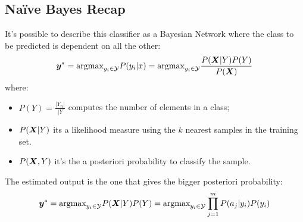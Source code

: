 \subsection{Naïve Bayes Recap}
It's possible to describe this classifier as a Bayesian Network where the class to be predicted is dependent on all the other:
\[\bm{y}^*=\text{argmax}_{y_i\in\mathcal{Y}}P(y_i\vert x)=\text{argmax}_{y_i\in\mathcal{Y}}\dfrac{P(\bm{X}\vert Y)P(Y)}{P(\bm{X})}\]
where:
\begin{itemize}
  \item $P(Y)=\frac{\vert Y_n\vert}{\vert Y}$ computes the number of elements in a class;
  \item $P(\bm{X}\vert Y)$ its a likelihood measure using the $k$ nearest samples in the training set.
  \item $P(\bm{X},Y)$ it's the a posteriori probability to classify the sample.
\end{itemize}
The estimated output is the one that gives the bigger posteriori probability:
\[\bm{y}^*=\text{argmax}_{y_i\in\mathcal{Y}}P(\bm{X}\vert Y)P(Y)=\text{argmax}_{y_i\in\mathcal{Y}}\displaystyle\prod_{j=1}^mP(a_j\vert y_i)P(y_i)\]






















